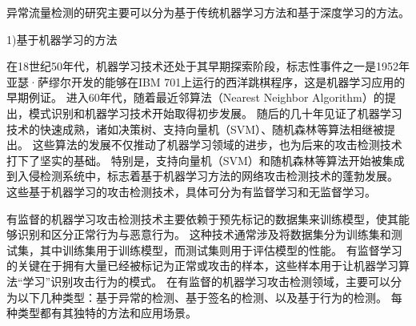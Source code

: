 

异常流量检测的研究主要可以分为基于传统机器学习方法和基于深度学习的方法。\par
1)基于机器学习的方法\par
在18世纪50年代，机器学习技术还处于其早期探索阶段，标志性事件之一是1952年亚瑟·萨缪尔开发的能够在IBM 701上运行的西洋跳棋程序，这是机器学习应用的早期例证。
进入60年代，随着最近邻算法（Nearest Neighbor Algorithm）\cite{cover1967nearest}的提出，模式识别和机器学习技术开始取得初步发展。
随后的几十年见证了机器学习技术的快速成熟，诸如决策树\cite{Quinlan1986}、支持向量机（SVM）\cite{Cortes1995}、随机森林\cite{Breiman2001}等算法相继被提出。
这些算法的发展不仅推动了机器学习领域的进步，也为后来的攻击检测技术打下了坚实的基础。
特别是，支持向量机（SVM）和随机森林等算法开始被集成到入侵检测系统中，标志着基于机器学习方法的网络攻击检测技术的蓬勃发展\cite{Mukkamala2002}。
这些基于机器学习的攻击检测技术，具体可分为有监督学习和无监督学习。



有监督的机器学习攻击检测技术主要依赖于预先标记的数据集来训练模型，使其能够识别和区分正常行为与恶意行为。
这种技术通常涉及将数据集分为训练集和测试集，其中训练集用于训练模型，而测试集则用于评估模型的性能。
有监督学习的关键在于拥有大量已经被标记为正常或攻击的样本，这些样本用于让机器学习算法“学习”识别攻击行为的模式。
在有监督的机器学习攻击检测领域，主要可以分为以下几种类型：基于异常的检测、基于签名的检测、以及基于行为的检测。
每种类型都有其独特的方法和应用场景。


